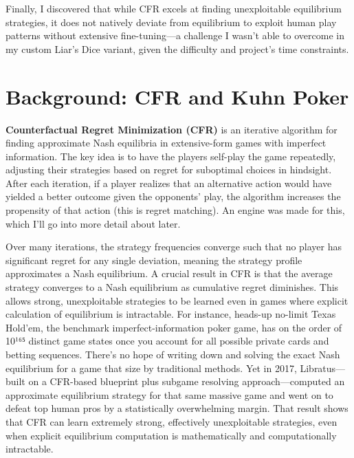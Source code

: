 \documentclass[
]{article}
\begin{document}
Finally, I discovered that while CFR excels at finding unexploitable
equilibrium strategies, it does not natively deviate from equilibrium to
exploit human play patterns without extensive fine-tuning---a challenge
I wasn't able to overcome in my custom Liar's Dice variant, given the
difficulty and project's time constraints.

\section*{\texorpdfstring{\textbf{Background: CFR and Kuhn
Poker}}{Background: CFR and Kuhn Poker}}\label{background-cfr-and-kuhn-poker}

\textbf{Counterfactual Regret Minimization (CFR)} is an iterative
algorithm for finding approximate Nash equilibria in extensive-form
games with imperfect information. The key idea is to have the players
self-play the game repeatedly, adjusting their strategies based on
regret for suboptimal choices in hindsight. After each iteration, if a
player realizes that an alternative action would have yielded a better
outcome given the opponents' play, the algorithm increases the
propensity of that action (this is regret matching). An engine was made
for this, which I'll go into more detail about later.

Over many iterations, the strategy frequencies converge such that no
player has significant regret for any single deviation, meaning the
strategy profile approximates a Nash equilibrium. A crucial result in
CFR is that the average strategy converges to a Nash equilibrium as
cumulative regret diminishes. This allows strong, unexploitable
strategies to be learned even in games where explicit calculation of
equilibrium is intractable. For instance, heads-up no-limit Texas
Hold'em, the benchmark imperfect-information poker game, has on the
order of 10¹⁶⁵ distinct game states once you account for all possible
private cards and betting sequences. There's no hope of writing down and
solving the exact Nash equilibrium for a game that size by traditional
methods. Yet in 2017, Libratus---built on a CFR-based blueprint plus
subgame resolving approach---computed an approximate equilibrium
strategy for that same massive game and went on to defeat top human pros
by a statistically overwhelming margin. That result shows that CFR can
learn extremely strong, effectively unexploitable strategies, even when
explicit equilibrium computation is mathematically and computationally
intractable.
\end{document}
